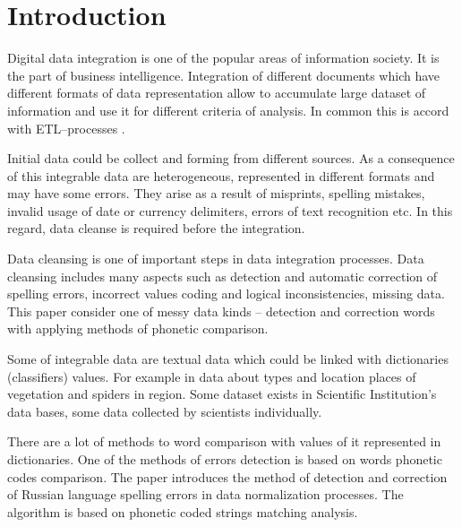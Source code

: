 \documentclass[conference,a4paper]{IEEEtran}
\begin{document}





%
\IEEEpeerreviewmaketitle



\section{Introduction}
Digital data integration is one of the popular areas of information society. It is the part of business intelligence. Integration of different documents which have different formats of data representation allow to accumulate large dataset of information and use it for different criteria of analysis. In common this is accord with ETL--processes \cite{Storeya-2017}.

Initial data could be collect and forming from different sources. As a consequence of this integrable data are heterogeneous, represented in different formats and may have some errors. They arise as a result of misprints, spelling mistakes, invalid usage of date or currency delimiters, errors of text recognition etc. In this regard, data cleanse is required before the integration.

Data cleansing is one of important steps in data integration processes. Data cleansing includes many aspects such as detection and automatic correction of spelling errors, incorrect values coding and logical inconsistencies, missing data. This paper consider one of messy data kinds -- detection and correction words with applying methods of phonetic comparison.

Some of integrable data are textual data which could be linked with dictionaries (classifiers) values. For example in data about types and location places of vegetation and spiders in region. Some dataset exists in Scientific Institution's data bases, some data collected by scientists individually.

There are a lot of methods to word comparison with values of it represented in dictionaries. One of the methods of errors detection is based on words phonetic codes comparison. The paper introduces the method of detection and correction of Russian language spelling errors in data normalization processes. The algorithm is based on phonetic coded strings matching analysis.
\end{document}
